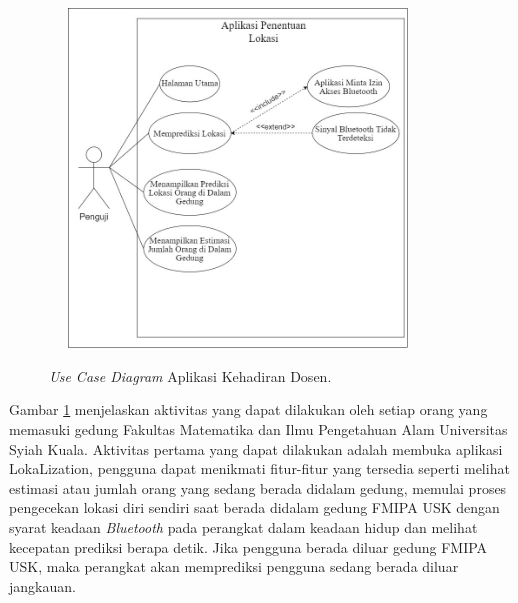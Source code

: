 \begin{figure}[H]
	\center
	\shadowbox
	{\includegraphics [width=10cm, height=9cm]{gambar/penentuanlokasi}}
	\caption{\textit{Use Case Diagram} Aplikasi Kehadiran Dosen.}
	\label{usecaseuser}
\end{figure}

\par Gambar \ref{usecaseuser} menjelaskan aktivitas yang dapat dilakukan oleh setiap orang yang memasuki gedung Fakultas Matematika dan Ilmu Pengetahuan Alam Universitas Syiah Kuala. Aktivitas pertama yang dapat dilakukan adalah membuka aplikasi LokaLization, pengguna dapat menikmati fitur-fitur yang tersedia seperti melihat estimasi atau jumlah orang yang sedang berada didalam gedung, memulai proses pengecekan lokasi diri sendiri saat berada didalam gedung FMIPA USK dengan syarat keadaan \textit{Bluetooth} pada perangkat dalam keadaan hidup dan melihat kecepatan prediksi berapa detik. Jika pengguna berada diluar gedung FMIPA USK, maka perangkat akan memprediksi pengguna sedang berada diluar jangkauan.



